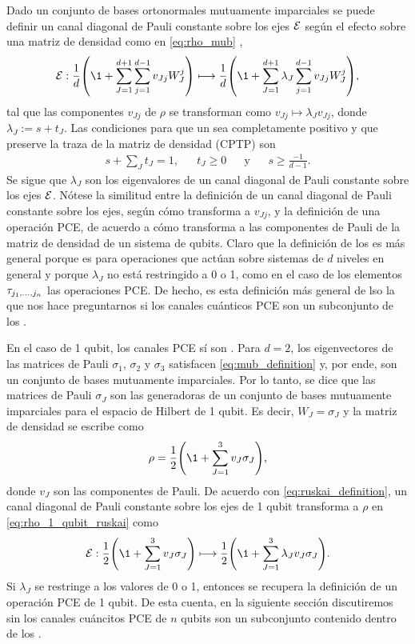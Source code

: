 Dado un conjunto de bases ortonormales mutuamente imparciales se
puede definir un canal diagonal de Pauli constante sobre los ejes $\mathcal{E}$ 
según el efecto sobre una matriz de densidad como en \eqref{eq:rho_mub}
\cite{nathanson2007pauli},
\begin{align}\label{eq:ruskai_definition}
	\E :  \frac{1}{d}\qty(\1+\sum_{J=1}^{d+1}\sum_{j=1}^{d-1} v_{Jj}W_J^j)
	\longmapsto 
	\frac{1}{d}\qty(\1+\sum_{J=1}^{d+1}\lambda_J\sum_{j=1}^{d-1} v_{Jj}W_J^j),
\end{align}
tal que las componentes $v_{Jj}$ de $\rho$ se transforman como 
$v_{Jj}\mapsto\lambda_Jv_{Jj}$, donde $\lambda_J:=s+t_J$. Las 
condiciones para que un \ruskaiMap{} sea completamente positivo 
y que preserve la traza de la matriz de densidad (CPTP) son
\begin{align}\label{eq:cptp_conditions_ruskai}
	s+\sum_{J}t_J=1, && t_J\geq0 && \text{y} && s\geq\frac{-1}{d-1}.
\end{align}
Se sigue que $\lambda_J$ son los 
eigenvalores de un canal diagonal de Pauli constante sobre los ejes $\mathcal{E}$.
Nótese la similitud entre la definición de un canal diagonal de Pauli constante
sobre los ejes, según cómo transforma a $v_{Jj}$, y 
la definición de una operación PCE, de acuerdo a cómo transforma a las 
componentes de Pauli de la matriz de densidad de un sistema de qubits.
Claro que la definición de los \ruskai es más general porque es para
operaciones que actúan sobre sistemas de $d$ niveles en general y porque 
$\lambda_J$ no está restringido a 0 o 1, como en el caso de los 
elementos $\tau_{j_1,\ldots ,j_n}$ las operaciones PCE. De hecho, es esta definición 
más general de lso \ruskai la que nos hace preguntarnos si los canales cuánticos 
PCE son un subconjunto de los \ruskai.

En el caso de 1 qubit, los canales PCE sí son \ruskai{}. Para $d=2$,
los eigenvectores de las matrices de Pauli $\sigma_1$, $\sigma_2$ y $\sigma_3$ 
satisfacen \eqref{eq:mub_definition} y, por ende, son un conjunto 
de bases mutuamente imparciales. Por lo tanto, se dice que las 
matrices de Pauli $\sigma_J$ son las generadoras de un conjunto de
bases mutuamente imparciales para el espacio de Hilbert de 1 qubit.
Es decir, $W_J=\sigma_J$ y la matriz de densidad se escribe como
\begin{align} \label{eq:rho_1_qubit_ruskai}
	\rho=\frac{1}{2}\qty(\1+\sum_{J=1}^3v_J\sigma_J),
\end{align}
donde $v_J$ son las componentes de Pauli.
De acuerdo con \eqref{eq:ruskai_definition}, 
un canal diagonal de Pauli constante sobre los ejes de 1 qubit transforma 
a $\rho$ en \eqref{eq:rho_1_qubit_ruskai} como
\begin{align}
	\E :  \frac{1}{2}\qty(\1+\sum_{J=1}^3v_J\sigma_J)
	\longmapsto 
	\frac{1}{2}\qty(\1+\sum_{J=1}^3\lambda_J v_J\sigma_J).
\end{align}
Si $\lambda_J$ se restringe a los valores de 0 o 1, entonces se recupera 
la definición de un operación PCE de 1 qubit. De esta cuenta, 
en la siguiente sección discutiremos sin los canales cuáncitos
PCE de $n$ qubits son un subconjunto contenido dentro de los \ruskai{}.

